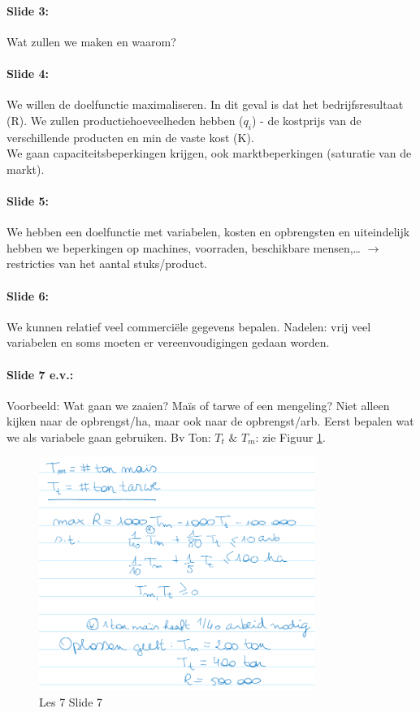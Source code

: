 \documentclass[10pt,a4paper]{report}
\begin{document}
\paragraph{Slide 3:} Wat zullen we maken en waarom?

\paragraph{Slide 4:} We willen de doelfunctie maximaliseren. In dit geval is dat het bedrijfsresultaat (R). We zullen productiehoeveelheden hebben ($q_{i}$) - de kostprijs van de verschillende producten en min de vaste kost (K).\\
We gaan capaciteitsbeperkingen krijgen, ook marktbeperkingen (saturatie van de markt).

\paragraph{Slide 5:} We hebben een doelfunctie met variabelen, kosten en opbrengsten en uiteindelijk hebben we beperkingen op machines, voorraden, beschikbare mensen,… $\rightarrow$ restricties van het aantal stuks/product.

\paragraph{Slide 6:} We kunnen relatief veel commerci\"ele gegevens bepalen. Nadelen: vrij veel variabelen en soms moeten er vereenvoudigingen gedaan worden.

\paragraph{Slide 7 e.v.:} Voorbeeld: Wat gaan we zaaien? Ma\"is of tarwe of een mengeling? Niet alleen kijken naar de opbrengst/ha, maar ook naar de opbrengst/arb. Eerst bepalen wat we als variabele gaan gebruiken. Bv Ton: $T_{t}$ $\&$ $T_{m}$: zie Figuur \ref{les07_02}.

\begin{figure}[h!]
\centering
\includegraphics[width=90mm]{Les07_02.png}
\caption{Les 7 Slide 7} 
\label{les07_02}
\end{figure}
\end{document}
